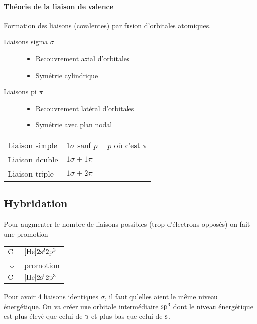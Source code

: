 \documentclass[11pt,a4paper,french]{article}
\begin{document}
\paragraph{Théorie de la liaison de valence}
Formation des liaisons (covalentes) par fusion d'orbitales atomiques.
\begin{description}
	\item[Liaisons sigma $\sigma$]
		\begin{itemize}
			\item Recouvrement axial d'orbitales
			\item Symétrie cylindrique
		\end{itemize}
	\item[Liaisons pi $\pi$]
		\begin{itemize}
			\item Recouvrement latéral d'orbitales
			\item Symétrie avec plan nodal
		\end{itemize}
\end{description}

\begin{center}
	\begin{tabular}{ll}
		Liaison simple & $1\sigma$ sauf $p-p$ où c'est $\pi$\\ %
		Liaison double & $1\sigma + 1\pi$\\
		Liaison triple & $1\sigma + 2\pi$
	\end{tabular}
\end{center}

\subsection{Hybridation}

Pour augmenter le nombre de liaisons possibles (trop d'électrons opposés) on fait une promotion
\begin{center}
	\begin{tabular}{ll}
		$\ce{C}$ & $[\ce{He}]2\sorb^22\porb^2$\\
		$\downarrow$ &  promotion\\
		$\ce{C}$ & $[\ce{He}]2\sorb^12\porb^3$
	\end{tabular}
\end{center}

Pour avoir 4 liaisons identiques $\sigma$, %
il faut qu'elles aient le même niveau énergétique.
On va créer une orbitale intermédiaire $\mathrm{s}\mathrm{p}^3$ dont le niveau énergétique est plus élevé que celui de $\mathrm{p}$ et plus bas que celui de $\mathrm{s}$.
\end{document}
